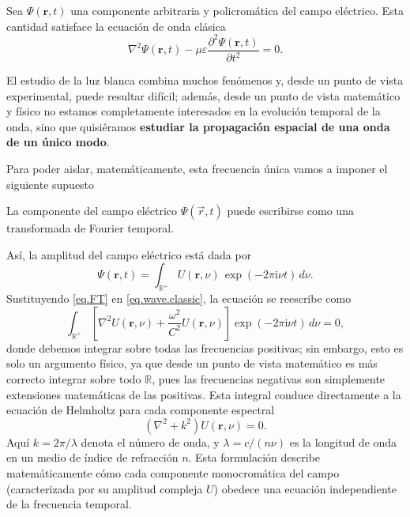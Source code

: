 	Sea $\Psi(\mathbf{r},t)$ una componente arbitraria y policromática del campo eléctrico. Esta cantidad satisface la ecuación de onda clásica
	\begin{equation}
		\nabla^{2}\Psi(\mathbf{r},t) - \mu\varepsilon \frac{\partial^{2}\Psi(\mathbf{r},t)}{\partial t^{2}} = 0.
		\label{eq.wave.classic}
	\end{equation}

	El estudio de la luz blanca combina muchos fenómenos y, desde un punto de vista experimental, puede resultar difícil; además, desde un punto de vista matemático y físico no estamos completamente interesados en la evolución temporal de la onda, sino que quisiéramos \textbf{estudiar la propagación espacial de una onda de un único modo}.

	Para poder aislar, matemáticamente, esta frecuencia única vamos a imponer el siguiente supuesto

	\begin{Assumption}
		La componente del campo eléctrico $\Psi(\vec{r},t)$ puede escribirse como una transformada de Fourier temporal.
	\end{Assumption}

	Así, la amplitud del campo eléctrico está dada por
	\begin{equation}
		\Psi(\mathbf{r},t) = \int_{\mathbb{R}^{+}} U(\mathbf{r},\nu) \, \exp(-2\pi\mathrm{i}\nu t) \, d\nu .
		\label{eq.FT}
	\end{equation}
	Sustituyendo \eqref{eq.FT} en \eqref{eq.wave.classic}, la ecuación se reescribe como
	\begin{equation}
		\int_{\mathbb{R}^{+}} \left[ \nabla^{2}U(\mathbf{r},\nu) + \frac{\omega^{2}}{C^{2}} U(\mathbf{r},\nu) \right] \exp(-2\pi\mathrm{i}\nu t) \, d\nu = 0,
	\end{equation}
	donde debemos integrar sobre todas las frecuencias positivas; sin embargo, esto es solo un argumento físico, ya que desde un punto de vista matemático es más correcto integrar sobre todo $\mathbb{R}$, pues las frecuencias negativas son simplemente extensiones matemáticas de las positivas. Esta integral conduce directamente a la ecuación de Helmholtz para cada componente espectral
	\begin{equation}
		(\nabla^{2} + k^{2})U(\mathbf{r},\nu) = 0 .
	\end{equation}
	Aquí $k = 2\pi/\lambda$ denota el número de onda, y $\lambda = c/(n\nu)$ es la longitud de onda en un medio de índice de refracción $n$. Esta formulación describe matemáticamente cómo cada componente monocromática del campo (caracterizada por su amplitud compleja $U$) obedece una ecuación independiente de la frecuencia temporal.

